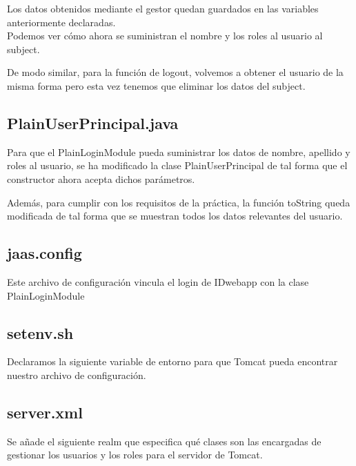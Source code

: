 \documentclass[10pt,a4paper]{article}
\begin{document}
Los datos obtenidos mediante el gestor quedan guardados en las variables anteriormente declaradas.\\

Podemos ver cómo ahora se suministran el nombre y los roles al usuario al subject.



De modo similar, para la función de logout, volvemos a obtener el usuario de la misma forma pero esta vez tenemos que eliminar los datos del subject.



\subsection*{PlainUserPrincipal.java}

Para que el PlainLoginModule pueda suministrar los datos de nombre, apellido y roles al usuario, se ha modificado la clase PlainUserPrincipal de tal forma que el constructor ahora acepta dichos parámetros.

Además, para cumplir con los requisitos de la práctica, la función toString queda modificada de tal forma que se muestran todos los datos relevantes del usuario.


\subsection*{jaas.config}
Este archivo de configuración vincula el login de IDwebapp con la clase PlainLoginModule


\subsection*{setenv.sh}
Declaramos la siguiente variable de entorno para que Tomcat pueda encontrar nuestro archivo de configuración.


\subsection*{server.xml}
Se añade el siguiente realm que especifica qué clases son las encargadas de gestionar los usuarios y los roles para el servidor de Tomcat.

\end{document}
